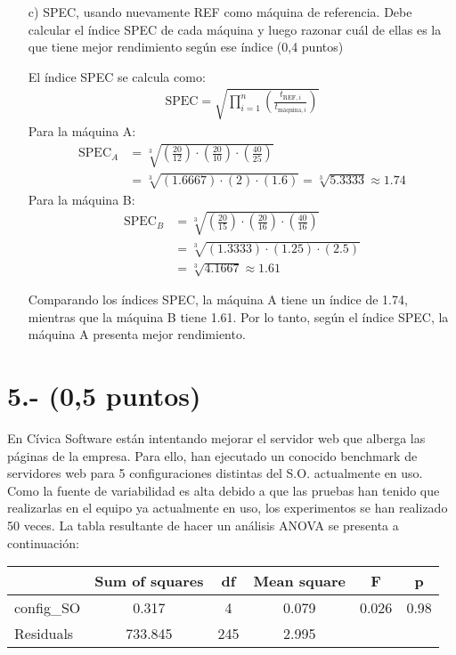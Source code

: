 \documentclass[a4paper,12pt]{article}
\begin{document}
\begin{enumerate}
    \item[c)] SPEC, usando nuevamente REF como máquina de referencia. Debe calcular el índice SPEC de cada máquina y luego razonar cuál de ellas es la que tiene mejor rendimiento según ese índice (0,4 puntos)
    
    El índice SPEC se calcula como:
    \begin{align*}
        \text{SPEC} = \sqrt{\prod_{i=1}^{n} \left( \frac{t_{\text{REF}, i}}{t_{\text{máquina}, i}}  \right) }
        \end{align*} 
    Para la máquina A:
    \begin{align*}
        \text{SPEC}_{A} &= \sqrt[3]{\left( \frac{20}{12} \right) \cdot \left( \frac{20}{10} \right) \cdot \left( \frac{40}{25} \right)} \\
        &= \sqrt[3]{\left( 1.6667 \right) \cdot (2) \cdot (1.6)} = \sqrt[3]{5.3333} \approx 1.74
    \end{align*}
    Para la máquina B:  
    \begin{align*}
        \text{SPEC}_{B} &= \sqrt[3]{\left( \frac{20}{15} \right) \cdot \left( \frac{20}{16} \right) \cdot \left( \frac{40}{16} \right)} \\
        &= \sqrt[3]{\left( 1.3333 \right) \cdot (1.25) \cdot (2.5)} \\
        &= \sqrt[3]{4.1667} \approx 1.61
    \end{align*}

    Comparando los índices SPEC, la máquina A tiene un índice de 1.74, mientras que la máquina B tiene 1.61. Por lo tanto, según el índice SPEC, la máquina A presenta mejor rendimiento.

\end{enumerate}

\section*{5.- (0,5 puntos)}
En Cívica Software están intentando mejorar el servidor web que alberga las páginas de la empresa. Para ello, han ejecutado un conocido benchmark de servidores web para 5 configuraciones distintas del S.O. actualmente en uso. Como la fuente de variabilidad es alta debido a que las pruebas han tenido que realizarlas en el equipo ya actualmente en uso, los experimentos se han realizado 50 veces. La tabla resultante de hacer un análisis ANOVA se presenta a continuación:

\begin{center}
\begin{tabular}{|l|c|c|c|c|c|}
\hline
 & Sum of squares & df & Mean square & F & p \\
\hline
config\_SO & 0.317 & 4 & 0.079 & 0.026 & 0.98 \\
Residuals & 733.845 & 245 & 2.995 & & \\
\hline
\end{tabular}
\end{center}
\end{document}
